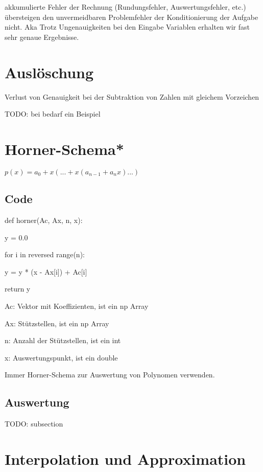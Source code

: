 \documentclass[12pt,a4paper]{article} %
\newcommand*\tab[1][1cm]{\hspace*{#1}}
\begin{document}
	akkumulierte Fehler der Rechnung (Rundungsfehler, Auswertungsfehler, etc.) übersteigen den unvermeidbaren Problemfehler der Konditionierung der Aufgabe nicht. Aka Trotz Ungenauigkeiten bei den Eingabe Variablen erhalten wir fast sehr genaue Ergebnisse.
	
	\newpage
	
	\section{Auslöschung}
	
	Verlust von Genauigkeit bei der Subtraktion von Zahlen mit gleichem Vorzeichen
	
	TODO: bei bedarf ein Beispiel
	
	\newpage
	
	\section{Horner-Schema*}
	
	$p(x) = a_0 + x(... + x(a_{n-1} + a_nx)...)$
	
	\subsection{Code}
	
	def horner(Ac, Ax, n, x): 
	
	y = 0.0
	
	for i in reversed range(n):
	
	\tab y = y * (x - Ax[i]) + Ac[i]
 
	return y
	
	Ac: Vektor mit Koeffizienten, ist ein np Array
	
	Ax: Stützstellen, ist ein np Array
	
	n: Anzahl der Stützstellen, ist ein int
	
	x: Auswertungspunkt, ist ein double
	
	Immer Horner-Schema zur Auswertung von Polynomen verwenden.
	
	\subsection{Auswertung}
	TODO: subsection
	
	\newpage
	
	\section{Interpolation und Approximation}
	
\end{document}
